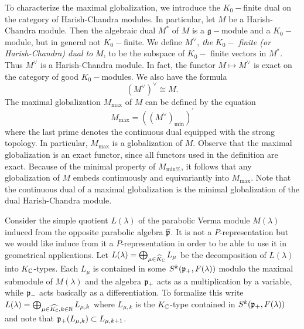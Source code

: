 To characterize the maximal globalization, we introduce the $%
K_{0}- $finite dual on the category of Harish-Chandra modules. In
particular, let $M $ be a Harish-Chandra module. Then the algebraic dual $%
M^{\ast }$ of $M$ is a $\mathfrak{g}-$module and a $K_{0}-$module, but in
general not $K_{0}-$finite. We define $M^{\vee }$, \emph{the} $K_{0}-$\emph{%
finite (or Harish-Chandra) dual to} $M$, to be the subspace of $K_{0}-$%
finite vectors in $M^{\ast }$. Thus $M^{\vee }$ is a Harish-Chandra module.
In fact, the functor $M\mapsto M^{\vee }$ is exact on the category of good $%
K_{0}-$modules. We also have the formula
\begin{equation*}
\left( M^{\vee }\right) ^{\vee }\cong M\text{.}
\end{equation*}%
The maximal globalization $M_{\text{max}}$ of $M$ can be defined by the
equation%
\begin{equation*}
M_{\text{max}}=\left( \left( M^{\vee }\right) _{\text{min}}\right) ^{\prime }
\end{equation*}%
where the last prime denotes the continuous dual equipped with the strong
topology. In particular, $M_{\text{max}}$ is a globalization of $M$. Observe
that the maximal globalization is an exact functor, since all functors used
in the definition are exact. Because of the minimal property of $M_{\text{min%
}}$, it follows that any globalization of $M$ embeds continuously and
equivariantly into $M_{\text{max}}$. Note that the continuous dual of a
maximal globalization is the minimal globalization of the dual
Harish-Chandra module.


Consider the simple quotient $L(\lambda)$ of the parabolic Verma module $M(\lambda)$ induced from the opposite parabolic algebra $\overline{\mathfrak{p}}$. It is not a $P$-representation but we would like induce from it a $P$-representation in order to be able to use it in geometrical applications. Let $L(\lambda)=\bigoplus_{\mu\in \widehat{K}_{\mathbb{C}}} L_\mu$ be the decomposition of $L(\lambda)$ into $K_{\mathbb{C}}$-types. Each $L_\mu$ is contained in some $S^k(\mathfrak{p}_+,F(\lambda))$ modulo the maximal submodule of $M(\lambda)$ and the algebra $\mathfrak{p}_+$ acts  as a multiplication by a variable, while $\mathfrak{p}_-$ acts basically as a differentiation. To formalize this write $L(\lambda) = \bigoplus_{\mu\in\widehat{K_{\mathbb{C}}}, k\in\mathbb{N}} L_{\mu,k}$ where $L_{\mu,k}$ is the $K_{\mathbb{C}}$-type contained in $S^k(\mathfrak{p}_+,F(\lambda))$ and note that $\mathfrak{p}_+ (L_{\mu,k}) \subset L_{\mu,k+1}$.

